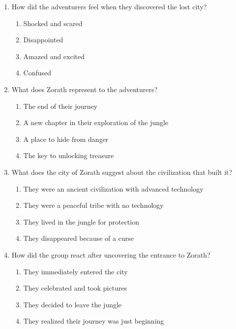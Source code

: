\documentclass[12pt]{article}
\begin{document}
\begin{enumerate}
\vspace{0.5cm}

\item How did the adventurers feel when they discovered the lost city?
\begin{enumerate}[label=\Alph*.]
    \item Shocked and scared
    \item Disappointed
    \item Amazed and excited
    \item Confused
\end{enumerate}

\vspace{0.5cm}

\item What does Zorath represent to the adventurers?
\begin{enumerate}[label=\Alph*.]
    \item The end of their journey
    \item A new chapter in their exploration of the jungle
    \item A place to hide from danger
    \item The key to unlocking treasure
\end{enumerate}

\vspace{0.5cm}

\item What does the city of Zorath suggest about the civilization that built it?
\begin{enumerate}[label=\Alph*.]
    \item They were an ancient civilization with advanced technology
    \item They were a peaceful tribe with no technology
    \item They lived in the jungle for protection
    \item They disappeared because of a curse
\end{enumerate}

\vspace{0.5cm}

\item How did the group react after uncovering the entrance to Zorath?
\begin{enumerate}[label=\Alph*.]
    \item They immediately entered the city
    \item They celebrated and took pictures
    \item They decided to leave the jungle
    \item They realized their journey was just beginning
\end{enumerate}


\end{enumerate}
\end{document}
